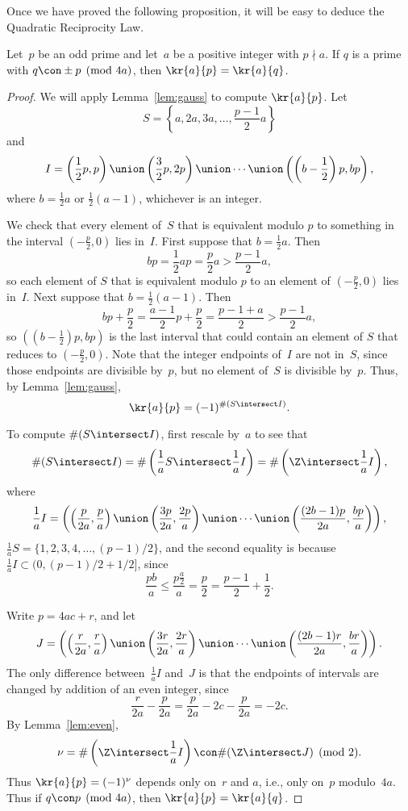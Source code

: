 Once we have proved the following
proposition, it will be easy to deduce the Quadratic Reciprocity Law.
\begin{proposition}[Euler]\label{prop:euler_prop}
Let~$p$ be an odd prime and let~$a$ be a positive integer with $p\nmid a$.
If $q$ is a prime with $q\con \pm p\pmod{4a}$, then
$\kr{a}{p} = \kr{a}{q}$.
\end{proposition}
\begin{proof}
We will apply Lemma~\ref{lem:gauss} to compute $\kr{a}{p}$.  Let
$$
S = \left\{a, 2a, 3a, \ldots, \frac{p-1}{2}a\right\}
$$
and
$$
I = \left(\frac{1}{2}p,p\right) \union \left(\frac{3}{2}p, 2p\right)
  \union \cdots \union \left(\left(b-\frac{1}{2}\right)p,bp\right),
$$
where $b=\frac{1}{2}a$ or $\frac{1}{2}(a-1)$, whichever is an integer.

We check that every element of~$S$ that is equivalent modulo $p$ to something in the
interval $(-\frac{p}{2},0)$ lies in~$I$.
First suppose that $b=\frac{1}{2}a$.  Then
$$bp = \frac{1}{2}a p = \frac{p}{2} a > \frac{p-1}{2} a,$$ so each
element of $S$ that is equivalent modulo $p$ to an
element of $(-\frac{p}{2},0)$ lies in~$I$.
Next suppose that $b=\frac{1}{2}(a-1)$.  Then
$$
  bp+\frac{p}{2} = \frac{a-1}{2}p + \frac{p}{2} = \frac{p-1+a}{2}> \frac{p-1}{2}a,
$$ so $((b-\frac{1}{2})p,bp)$ is the
last interval that could contain an element of $S$ that reduces to
$(-\frac{p}{2},0)$.  Note that the integer endpoints of~$I$ are not
in~$S$, since those endpoints are divisible by~$p$, but no element
of~$S$ is divisible by~$p$.  Thus, by Lemma~\ref{lem:gauss},
$$\kr{a}{p} = (-1)^{\# (S\intersect I)}.$$

To compute $\#(S\intersect I)$, first rescale by~$a$ to see that
$$
\#(S\intersect I) = \#\left(\frac{1}{a} S \intersect \frac{1}{a}I\right)
 = \#\left(\Z \intersect \frac{1}{a}I\right),
$$
where
$$\frac{1}{a} I = \left(\left(\frac{p}{2a},\frac{p}{a}\right) \union \left(\frac{3p}{2a},\frac{2p}{a}\right) \union \cdots \union \left(\frac{(2b-1)p}{2a},\frac{bp}{a}\right) \right),$$
$\frac{1}{a}S = \{1,2,3,4,\ldots,(p-1)/2\}$, and
the second equality is because $\frac{1}{a} I \subset (0,(p-1)/2 + 1/2]$,
since $$\frac{pb}{a} \leq \frac{p \frac{a}{2}}{a} = \frac{p}{2} =
\frac{p-1}{2}+\frac{1}{2}.$$

Write $p=4ac+r$, and let
$$
J = \left(\left(\frac{r}{2a},\frac{r}{a}\right) \union \left(\frac{3r}{2a},\frac{2r}{a}\right) \union \cdots \union \left(\frac{(2b-1)r}{2a},\frac{br}{a}\right) \right).
$$
The only difference between~$\frac{1}{a}I$ and~$J$ is that the endpoints of
intervals are changed by addition of an even integer,
since
$$
\frac{r}{2a} - \frac{p}{2a} = \frac{p}{2a} - 2c - \frac{p}{2a} = -2c.
$$
  By
Lemma~\ref{lem:even},
$$
  \nu=\#\left(\Z \intersect \frac{1}{a}I\right) \con \#(\Z\intersect J)\pmod{2}.
$$
Thus $\kr{a}{p}=(-1)^\nu$ depends only on~$r$ and $a$, i.e., only
on~$p$ modulo~$4a$.  Thus if $q\con p\pmod{4a}$, then
$\kr{a}{p}=\kr{a}{q}$.


\end{proof}

